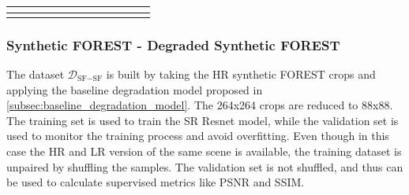 \begin{table}[H]
{\begin{tabular}{c|cccc|cccc|cccc}
                & \multicolumn{1}{c|}{}                                                        & \multicolumn{1}{c|}{}                                                                  &                                                        &                                                                   &                                                        & \multicolumn{1}{c|}{}                                                        &                                                        &                                                         &                                                        & \multicolumn{1}{c|}{}                                                        &                                                        & \multicolumn{1}{c|}{}                                                        \\ \hline
                & \multicolumn{1}{c|}{}                                                        & \multicolumn{1}{c|}{}                                                                  &                                                        &                                                                   &                                                        & \multicolumn{1}{c|}{}                                                        &                                                        &                                                         &                                                        & \multicolumn{1}{c|}{}                                                        &                                                        & \multicolumn{1}{c|}{}                                                       
    \end{tabular}%
    }
    \caption{}
    \label{tab:my-table}
    \end{table}


\subsubsection{Synthetic FOREST - Degraded Synthetic FOREST}
    The dataset $\mathcal{D}_{\text{SF}-\text{SF}}$ is built by taking the HR synthetic FOREST crops and applying the baseline degradation model proposed in \ref{subsec:baseline_degradation_model}. 
    The 264x264 crops are reduced to 88x88. The training set is used to train the SR Resnet model, while the validation set is used to monitor the training process and avoid overfitting. 
    Even though in this case the HR and LR version of the same scene is available, the training dataset is unpaired by shuffling the samples.
    The validation set is not shuffled, and thus can be used to calculate supervised metrics like PSNR and SSIM. 

